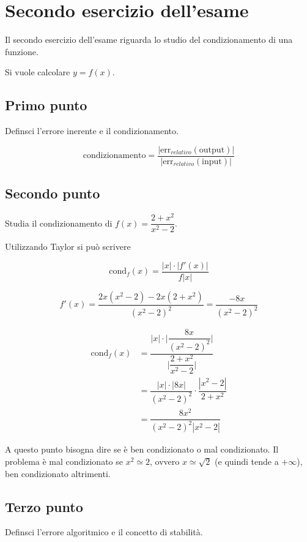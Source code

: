 \section{Secondo esercizio dell'esame}
Il secondo esercizio dell'esame riguarda lo studio del condizionamento di una funzione.

Si vuole calcolare $y=f(x)$.

\subsection{Primo punto}
 Definsci l'errore inerente e il condizionamento.

\begin{equation*}
  \mbox{condizionamento} = \dfrac{|\mbox{err}_{relativo}(\mbox{output})|}{|\mbox{err}_{relativo}(\mbox{input})|}
\end{equation*}


\subsection{Secondo punto} Studia il condizionamento di $f(x)=\dfrac{2+x^2}{x^2-2}$.\medskip

Utilizzando Taylor si può scrivere

\begin{equation*}
  \mbox{cond}_f (x) = \dfrac{|x|\cdot |f'(x)|}{f|x|}
\end{equation*}
  
\begin{equation*}
  f'(x) = \dfrac{2x(x^2-2)-2x(2+x^2)}{(x^2-2)^2} = \dfrac{-8x}{(x^2-2)^2}
\end{equation*}
  
\begin{equation*}
\begin{split}
  \mbox{cond}_f (x) & = \dfrac{|x|\cdot \Bigg| \dfrac{8x}{(x^2-2)^2}\Bigg|}{\Bigg| \dfrac{2+x^2}{x^2-2}\Bigg| }\\[1.5ex]
  & = \dfrac{|x|\cdot |8x|}{(x^2-2)^2} \cdot \dfrac{|x^2-2|}{2+x^2}\\[1.5ex]
  & = \dfrac{8x^2}{(x^2-2)^2|x^2-2|}
\end{split}
\end{equation*}

A questo punto bisogna dire se è ben condizionato o mal condizionato. Il problema è mal condizionato se $x^2\simeq 2$, ovvero $x\simeq \sqrt{2}$ (e quindi tende a $+\infty$), ben condizionato altrimenti.


\subsection{Terzo punto} Definsci l'errore algoritmico e il concetto di stabilità.


